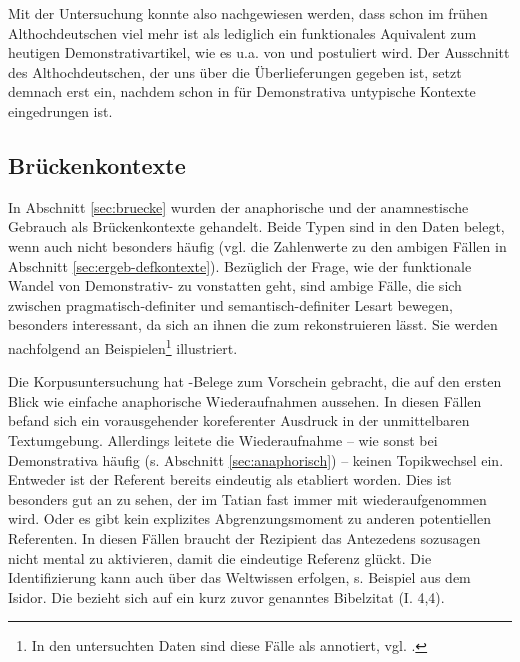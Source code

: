 Mit der Untersuchung konnte also nachgewiesen werden, dass  schon im frühen Althochdeutschen viel mehr ist als lediglich ein funktionales Aquivalent zum heutigen Demonstrativartikel, wie es u.a. von \textcite{Philippi1997} und \textcite{Demske2001} postuliert wird. Der Ausschnitt des Althochdeutschen, der uns über die Überlieferungen gegeben ist, setzt demnach erst ein, nachdem  schon in für Demonstrativa  untypische Kontexte eingedrungen ist. 


\subsection{Brückenkontexte}\label{sec:disk-bruecken}

In Abschnitt \ref{sec:bruecke} wurden der anaphorische  und der anamnestische  Gebrauch als Brückenkontexte  gehandelt. Beide Typen sind in den Daten belegt, wenn auch nicht besonders häufig (vgl. die Zahlenwerte zu den ambigen Fällen in Abschnitt \ref{sec:ergeb-defkontexte}). Bezüglich der Frage, wie der funktionale Wandel von Demonstrativ-  zu  vonstatten geht, sind ambige Fälle, die sich zwischen pragmatisch-definiter  und semantisch-definiter  Lesart bewegen, besonders interessant, da sich an ihnen die  zum  rekonstruieren lässt. Sie werden nachfolgend an Beispielen\footnote{In den untersuchten Daten sind diese Fälle als   annotiert, vgl. \textcite{HZKYL4_2020}.} illustriert. 

 

Die Korpusuntersuchung  hat -Belege zum Vorschein gebracht, die auf den ersten Blick wie einfache anaphorische  Wiederaufnahmen aussehen. In diesen Fällen befand sich ein vorausgehender koreferenter Ausdruck in der unmittelbaren Textumgebung. Allerdings leitete die Wiederaufnahme -- wie sonst bei Demonstrativa  häufig (s. Abschnitt \ref{sec:anaphorisch}) -- keinen Topikwechsel   ein. Entweder ist der Referent bereits eindeutig als  etabliert worden. Dies ist besonders gut an  zu sehen, der im Tatian fast immer mit  wiederaufgenommen wird. Oder es gibt kein explizites Abgrenzungsmoment zu anderen potentiellen Referenten.
In diesen Fällen braucht der Rezipient das Antezedens sozusagen nicht mental zu aktivieren, damit die eindeutige Referenz  glückt. Die Identifizierung kann auch über das Weltwissen erfolgen, s. Beispiel  aus dem Isidor. Die     bezieht sich auf ein kurz zuvor genanntes Bibelzitat  (I. 4,4).

